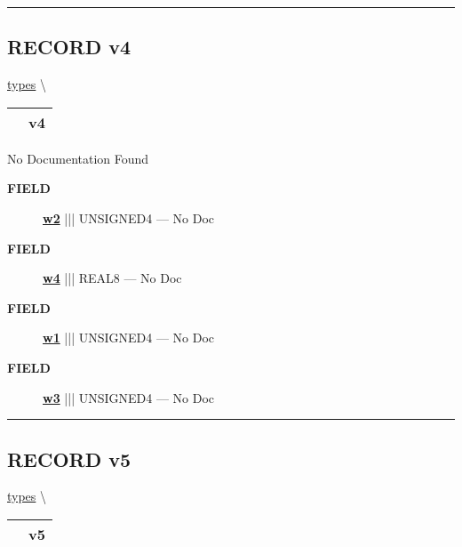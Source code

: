 \rule{\linewidth}{0.5pt}
\subsection*{\textsf{\colorbox{headtoc}{\color{white} RECORD}
v4}}

\hypertarget{ecldoc:types.v4}{}
\hspace{0pt} \hyperlink{ecldoc:types}{types} \textbackslash 

{\renewcommand{\arraystretch}{1.5}
\begin{tabularx}{\textwidth}{|>{\raggedright\arraybackslash}l|X|}
\hline
\hspace{0pt}\mytexttt{\color{red} } & \textbf{v4} \\
\hline
\end{tabularx}
}

\par





No Documentation Found







\par
\begin{description}
\item [\colorbox{tagtype}{\color{white} \textbf{\textsf{FIELD}}}] \textbf{\underline{w2}} ||| UNSIGNED4 --- No Doc
\item [\colorbox{tagtype}{\color{white} \textbf{\textsf{FIELD}}}] \textbf{\underline{w4}} ||| REAL8 --- No Doc
\item [\colorbox{tagtype}{\color{white} \textbf{\textsf{FIELD}}}] \textbf{\underline{w1}} ||| UNSIGNED4 --- No Doc
\item [\colorbox{tagtype}{\color{white} \textbf{\textsf{FIELD}}}] \textbf{\underline{w3}} ||| UNSIGNED4 --- No Doc
\end{description}





\rule{\linewidth}{0.5pt}
\subsection*{\textsf{\colorbox{headtoc}{\color{white} RECORD}
v5}}

\hypertarget{ecldoc:types.v5}{}
\hspace{0pt} \hyperlink{ecldoc:types}{types} \textbackslash 

{\renewcommand{\arraystretch}{1.5}
\begin{tabularx}{\textwidth}{|>{\raggedright\arraybackslash}l|X|}
\hline
\hspace{0pt}\mytexttt{\color{red} } & \textbf{v5} \\
\hline
\end{tabularx}
}


